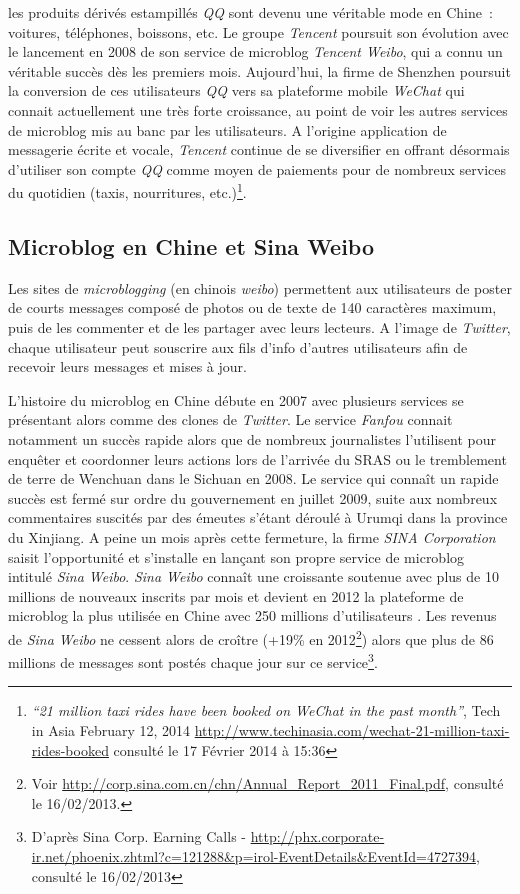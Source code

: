les produits dérivés estampillés \textit{QQ} sont devenu une véritable mode en Chine : voitures, téléphones, boissons, etc. Le groupe \textit{Tencent} poursuit son évolution avec le lancement en 2008 de son service de microblog \textit{Tencent Weibo}, qui a connu un véritable succès dès les premiers mois. Aujourd’hui, la firme de Shenzhen poursuit la conversion de ces utilisateurs \textit{QQ} vers sa plateforme mobile \textit{WeChat} qui connait actuellement une très forte croissance, au point de voir les autres services de microblog mis au banc par les utilisateurs. A l’origine application de messagerie écrite et vocale, \textit{Tencent} continue de se diversifier en offrant désormais d’utiliser son compte \textit{QQ} comme moyen de paiements pour de nombreux services du quotidien (taxis, nourritures, etc.)\footnote{\textit{“21 million taxi rides have been booked on WeChat in the past month”}, Tech in Asia February 12, 2014 \url{http://www.techinasia.com/wechat-21-million-taxi-rides-booked} consulté le 17 Février 2014 à 15:36}.

\subsection[Microblog en Chine et Sina Weibo]{Microblog en Chine et Sina Weibo}
Les sites de \textit{microblogging} (en chinois \textit{weibo}) permettent aux utilisateurs de poster de courts messages composé de photos ou de texte de 140 caractères maximum, puis de les commenter et de les partager avec leurs lecteurs. A l’image de \textit{Twitter}, chaque utilisateur peut souscrire aux fils d’info d’autres utilisateurs afin de recevoir leurs messages et mises à jour.

L’histoire du microblog en Chine débute en 2007 avec plusieurs services se présentant alors comme des clones de \textit{Twitter}. Le service \textit{Fanfou} connait notamment un succès rapide alors que de nombreux journalistes l’utilisent pour enquêter et coordonner leurs actions lors de l’arrivée du SRAS ou le tremblement de terre de Wenchuan dans le Sichuan en 2008. Le service qui connaît un rapide succès est fermé sur ordre du gouvernement en juillet 2009, suite aux nombreux commentaires suscités par des émeutes s’étant déroulé à Urumqi dans la province du Xinjiang. A peine un mois après cette fermeture, la firme \textit{SINA Corporation} saisit l’opportunité et s’installe en lançant son propre service de microblog intitulé \textit{Sina Weibo}. \textit{Sina Weibo} connaît une croissante soutenue avec plus de 10 millions de nouveaux inscrits par mois et devient en 2012 la plateforme de microblog la plus utilisée en Chine avec 250 millions d’utilisateurs \citep{Milhard2012}. Les revenus de \textit{Sina Weibo} ne cessent alors de croître (+19\% en 2012\footnote{Voir \url{http://corp.sina.com.cn/chn/Annual_Report_2011_Final.pdf}, consulté le 16/02/2013.}) alors que plus de 86 millions de messages sont postés chaque jour sur ce service\footnote{D’après Sina Corp. Earning Calls - \url{http://phx.corporate-ir.net/phoenix.zhtml?c=121288&p=irol-EventDetails&EventId=4727394}, consulté le 16/02/2013}. 


